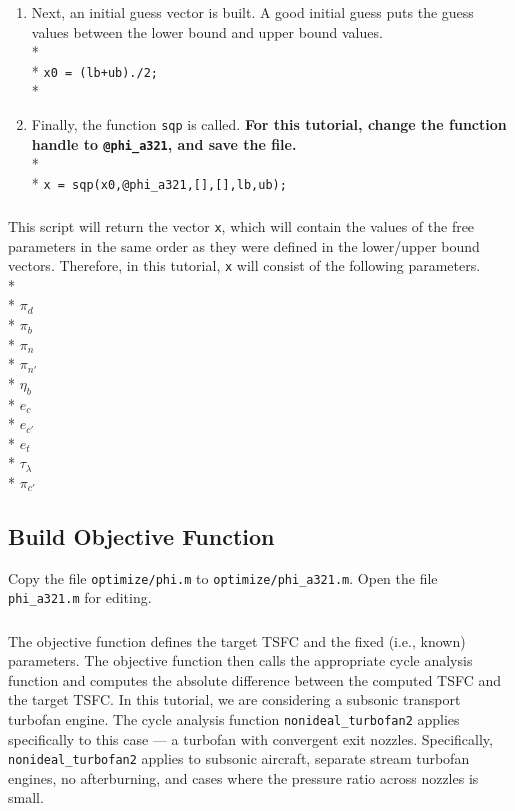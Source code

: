 \documentclass[12pt,twoside]{article}
\begin{document}
\begin{enumerate}
\item Next, an initial guess vector is built.  A good initial guess
  puts the guess values between the lower bound and upper bound
  values. \\*
  \\*
  \texttt{x0 = (lb+ub)./2;}\\*

\item Finally, the function \texttt{sqp} is called.  \textbf{For this tutorial, change the function handle to \texttt{@phi\_a321}, and save the file.}\\*
  \\*
  \texttt{x = sqp(x0,@phi\_a321,[],[],lb,ub);}

\end{enumerate}

\subparagraph{}
This script will return the vector \texttt{x}, which will contain the values of the free parameters in the same order as they were defined in the lower/upper bound vectors.  Therefore, in this tutorial, \texttt{x} will consist of the following parameters.\\*
\\*
$\pi_d$\\*
$\pi_b$\\*
$\pi_n$\\*
$\pi_{n'}$\\*
$\eta_b$\\*
$e_c$\\*
$e_{c'}$\\*
$e_t$\\*
$\tau_\lambda$\\*
$\pi_{c'}$

\subsection{Build Objective Function}
Copy the file \texttt{optimize/phi.m} to
\texttt{optimize/phi\_a321.m}.  Open the file \texttt{phi\_a321.m} for
editing.

\subparagraph{}
The objective function defines the target TSFC and the fixed (i.e.,
known) parameters.  The objective function then calls the appropriate
cycle analysis function and computes the absolute difference between
the computed TSFC and the target TSFC.  In this tutorial, we are
considering a subsonic transport turbofan engine.  The cycle analysis
function \texttt{nonideal\_turbofan2} applies specifically to this
case --- a turbofan with convergent exit nozzles.  Specifically,
\texttt{nonideal\_turbofan2} applies to subsonic aircraft, separate
stream turbofan engines, no afterburning, and cases where the pressure
ratio across nozzles is small.
\end{document}
